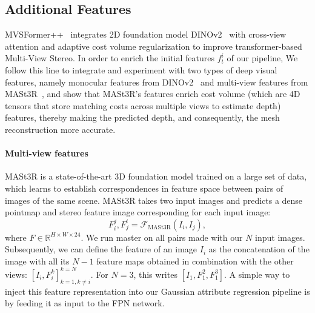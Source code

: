 \subsection{Additional Features}
MVSFormer++~\cite{cao2024mvsformer++} integrates 2D foundation model DINOv2~\cite{oquab2023dinov2} with cross-view attention and adaptive cost volume regularization to improve transformer-based Multi-View Stereo. In order to enrich the initial features $f_t^i$ of our pipeline, We follow this line to integrate and experiment with two types of deep visual features, namely monocular features from DINOv2~\cite{oquab2023dinov2} and multi-view features from MASt3R~\cite{leroy2024grounding}, and show that MASt3R's features enrich cost volume (which are 4D tensors that store matching costs across multiple views to estimate depth) features, thereby making the predicted depth, and consequently, the mesh reconstruction more accurate.
\vspace{-5pt}
\paragraph{Multi-view features}
\label{sec:feat_merge}
MASt3R is a state-of-the-art 3D foundation model trained on a large set of data, which learns to establish correspondences in feature space between pairs of images of the same scene. MASt3R takes two input images and predicts a dense pointmap and stereo feature image corresponding for each input image:
\begin{equation}
F^{j}_{i}, F^{i}_{j} = \mathcal{F}_{\text{MASt3R}}(I_{i}, I_{j}),
\end{equation}
where $F\in\mathbb{R}^{H\times W \times 24}$. 
We run master on all pairs made with our $N$ input images. Subsequently, we can define the feature of an image $I_i$ as the concatenation of the image with all its $N-1$ feature maps obtained in combination with the other views: $[I_i,F_i^k]_{k=1,k\neq i}^{k=N}$. For $N=3$, this writes  $[I_1,F_1^2,F_1^3]$. A simple way to inject this feature representation into our Gaussian attribute regression pipeline is by feeding it as input to the FPN network.

